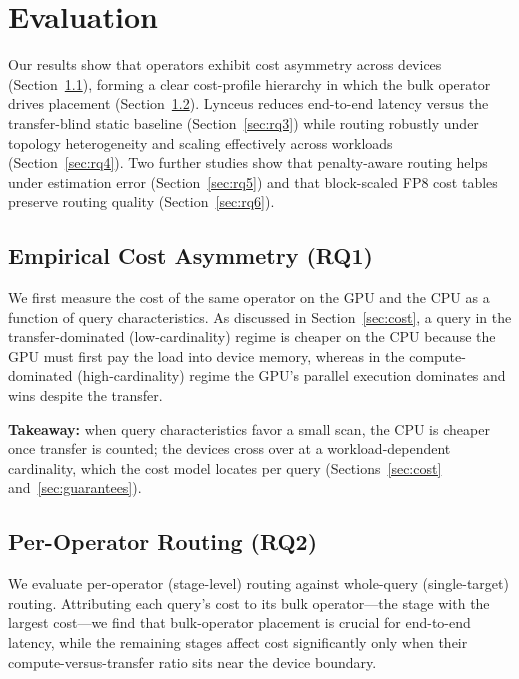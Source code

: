 \documentclass{article}
\begin{document}
\section{Evaluation}
\label{sec:evaluation}

Our results show that operators exhibit cost asymmetry across devices
(Section~\ref{sec:rq1}), forming a clear cost-profile hierarchy in which the bulk
operator drives placement (Section~\ref{sec:rq2}). Lynceus reduces end-to-end
latency versus the transfer-blind static baseline (Section~\ref{sec:rq3}) while
routing robustly under topology heterogeneity and scaling effectively across
workloads (Section~\ref{sec:rq4}). Two further studies show that penalty-aware
routing helps under estimation error (Section~\ref{sec:rq5}) and that
block-scaled FP8 cost tables preserve routing quality (Section~\ref{sec:rq6}).

\subsection{Empirical Cost Asymmetry (RQ1)}
\label{sec:rq1}

We first measure the cost of the same operator on the GPU and the CPU as a
function of query characteristics. As discussed in Section~\ref{sec:cost}, a query
in the transfer-dominated (low-cardinality) regime is cheaper on the CPU because
the GPU must first pay the load into device memory, whereas in the
compute-dominated (high-cardinality) regime the GPU's parallel execution
dominates and wins despite the transfer.

\textbf{Takeaway:} when query characteristics favor a small scan, the CPU is
cheaper once transfer is counted; the devices cross over at a workload-dependent
cardinality, which the cost model locates per query
(Sections~\ref{sec:cost} and~\ref{sec:guarantees}).

\subsection{Per-Operator Routing (RQ2)}
\label{sec:rq2}

We evaluate per-operator (stage-level) routing against whole-query
(single-target) routing. Attributing each query's cost to its bulk operator---the
stage with the largest cost---we find that bulk-operator placement is crucial for
end-to-end latency, while the remaining stages affect cost significantly only
when their compute-versus-transfer ratio sits near the device boundary.
\end{document}
